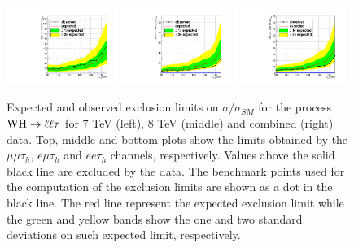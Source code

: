 \begin{figure}
\begin{center}
  \includegraphics[width=0.32\textwidth]{4_Analisys/pics/limits/eet/eet_7TeV.pdf}
  \includegraphics[width=0.32\textwidth]{4_Analisys/pics/limits/eet/eet_8TeV.pdf}
  \includegraphics[width=0.32\textwidth]{4_Analisys/pics/limits/eet/eet.pdf} \\
  \caption{Expected and observed exclusion limits on $\sigma/\sigma_{SM}$ for the process $\mathrm{W}\mathrm{H} \rightarrow \ell \ell \tau$ for 7 TeV (left), 8 TeV (middle) and combined (right) data. Top, middle and bottom plots show the limits obtained by the $\mu\mu\tau_h$, $e\mu\tau_h$ and $ee\tau_h$ channels, respectively. Values above the solid black line are excluded by the data. The benchmark points used for the computation of the exclusion limits are shown as a dot in the black line. The red line represent the expected exclusion limit while the green and yellow bands show the one and two standard deviations on such expected limit, respectively.}
  \label{fig:llt_chan_limits}
\end{center}
\end{figure}

